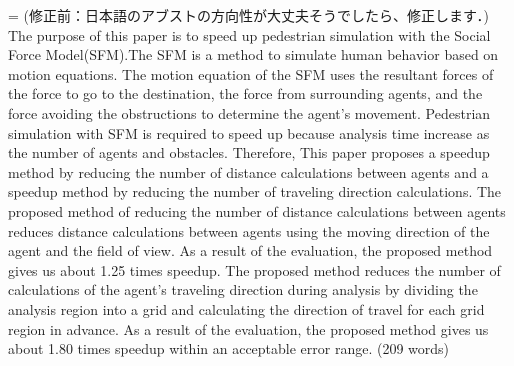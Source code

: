 %

={
(修正前：日本語のアブストの方向性が大丈夫そうでしたら、修正します．)
The purpose of this paper is to speed up pedestrian simulation with the Social Force Model(SFM).The SFM is a method to simulate human behavior based on motion equations. The motion equation of the SFM uses the resultant forces of the force to go to the destination, the force from surrounding agents, and the force avoiding the obstructions to determine the agent’s movement. Pedestrian simulation with SFM is required to speed up because analysis time increase as the number of agents and obstacles. Therefore, This paper proposes a speedup method by reducing the number of distance calculations between agents and a speedup method by reducing the number of traveling direction calculations. The proposed method of reducing the number of distance calculations between agents reduces distance calculations between agents using the moving direction of the agent and the ﬁeld of view. As a result of the evaluation, the proposed method gives us about 1.25 times speedup. The proposed method reduces the number of calculations of the agent’s traveling direction during analysis by dividing the analysis region into a grid and calculating the direction of travel for each grid region in advance. As a result of the evaluation, the proposed method gives us about 1.80 times speedup within an acceptable error range.
(209 words)
}

